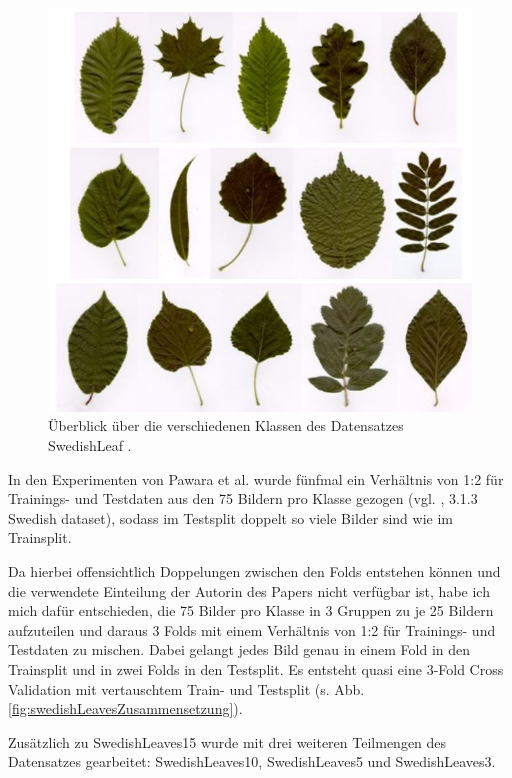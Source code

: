 \begin{figure}[H]
\centering
\includegraphics[scale=0.8]{img/2_swedishLeaves-image.jpg}
\caption{Überblick über die verschiedenen Klassen des Datensatzes SwedishLeaf \cite{swedishLeaves}.}
\label{fig:swedishLeavesUeberblick}
\end{figure}

In den Experimenten von Pawara et al. \cite{pawaraPaper} wurde fünfmal ein Verhältnis von 1:2 für Trainings- und Testdaten aus den 75 Bildern pro Klasse gezogen (vgl. \cite{pawaraPaper}, 3.1.3 Swedish dataset), sodass im Testsplit doppelt so viele Bilder sind wie im Trainsplit.

Da hierbei offensichtlich Doppelungen zwischen den Folds entstehen können und die verwendete Einteilung der Autorin des Papers \cite{pawaraPaper} nicht verfügbar ist, habe ich mich dafür entschieden, die 75 Bilder pro Klasse in 3 Gruppen zu je 25 Bildern aufzuteilen und daraus 3 Folds mit einem Verhältnis von 1:2 für Trainings- und Testdaten zu mischen. Dabei gelangt jedes Bild genau in einem Fold in den Trainsplit und in zwei Folds in den Testsplit. Es entsteht quasi eine 3-Fold Cross Validation mit vertauschtem Train- und Testsplit (s. Abb. \ref{fig:swedishLeavesZusammensetzung}).

Zusätzlich zu SwedishLeaves15 wurde mit drei weiteren Teilmengen des Datensatzes gearbeitet: SwedishLeaves10, SwedishLeaves5 und SwedishLeaves3.

